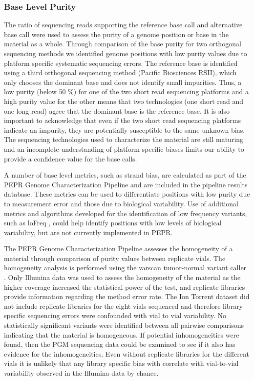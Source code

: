 \documentclass[smallextended]{svjour3}\usepackage[]{graphicx}\usepackage[]{color}
\begin{document}
\subsubsection{Base Level Purity}
The ratio of sequencing reads supporting the reference base call and alternative base call were used to assess the purity of a genome position or base in the material as a whole. Through comparison of the base purity for two orthogonal sequencing methods we identified genome positions with low purity values due to platform specific systematic sequencing errors. The reference base is identified using a third orthogonal sequencing method (Pacific Biosciences RSII), which only chooses the dominant base and does not identify small impurities. Thus, a low purity (below 50 \%) for one of the two short read sequencing platforms and a high purity value for the other means that two technologies (one short read and one long read) agree that the dominant base is the reference base. It is also important to acknowledge that even if the two short read sequencing platforms indicate an impurity, they are potentially susceptible to the same unknown bias. The sequencing technologies used to characterize the material are still maturing and an incomplete understanding of platform specific biases limits our ability to provide a confidence value for the base calls. 

A number of base level metrics, such as strand bias, are calculated as part of the PEPR Genome Characterization Pipeline and are included in the pipeline results database. These metrics can be used to differentiate positions with low purity due to measurement error and those due to biological variability. Use of additional metrics and algorithms developed for the identification of low frequency variants, such as loFreq \cite{Wilm2012}, could help identify positions with low levels of biological variability, but are not currently implemented in PEPR. 

The PEPR Genome Characterization Pipeline assesses the homogeneity of a material through comparison of purity values between replicate vials.  The homogeneity analysis is performed using the varscan tumor-normal variant caller \cite{Koboldt2009}.  Only Illumina data was used to assess the homogeneity of the material as the higher coverage increased the statistical power of the test, and replicate libraries provide information regarding the method error rate.  The Ion Torrent dataset did not include replicate libraries for the eight vials sequenced and therefore library specific sequencing errors were confounded with vial to vial variability. No statistically significant variants were identified between all pairwise comparisons indicating that the material is homogeneous. If potential inhomogeneities were found, then the PGM sequencing data could be examined to see if it also has evidence for the inhomogeneities. Even without replicate libraries for the different vials it is unlikely that any library specific bias with correlate with vial-to-vial variability observed in the Illumina data by chance.
\end{document}
